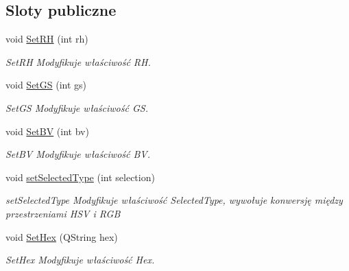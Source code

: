 \subsection*{Sloty publiczne}
\begin{DoxyCompactItemize}
\item 
void \mbox{\hyperlink{class_color_view_model_a0e3aa4fdb5fd3f05d3bd5c82ee571c91}{Set\+RH}} (int rh)
\begin{DoxyCompactList}\small\item\em Set\+RH Modyfikuje właściwość RH. \end{DoxyCompactList}\item 
void \mbox{\hyperlink{class_color_view_model_a7ef1ac038793902b460f5b65a66ba063}{Set\+GS}} (int gs)
\begin{DoxyCompactList}\small\item\em Set\+GS Modyfikuje właściwość GS. \end{DoxyCompactList}\item 
void \mbox{\hyperlink{class_color_view_model_a07fbf050b15842e8e68c32c44ef9c6dd}{Set\+BV}} (int bv)
\begin{DoxyCompactList}\small\item\em Set\+BV Modyfikuje właściwość BV. \end{DoxyCompactList}\item 
void \mbox{\hyperlink{class_color_view_model_a51b5ff8b09631334b01ad95e0559452f}{set\+Selected\+Type}} (int selection)
\begin{DoxyCompactList}\small\item\em set\+Selected\+Type Modyfikuje właściwość Selected\+Type, wywołuje konwersję między przestrzeniami H\+SV i R\+GB \end{DoxyCompactList}\item 
void \mbox{\hyperlink{class_color_view_model_ae5d39c213d8ef75346766d006e55e142}{Set\+Hex}} (Q\+String hex)
\begin{DoxyCompactList}\small\item\em Set\+Hex Modyfikuje właściwość Hex. \end{DoxyCompactList}\end{DoxyCompactItemize}
